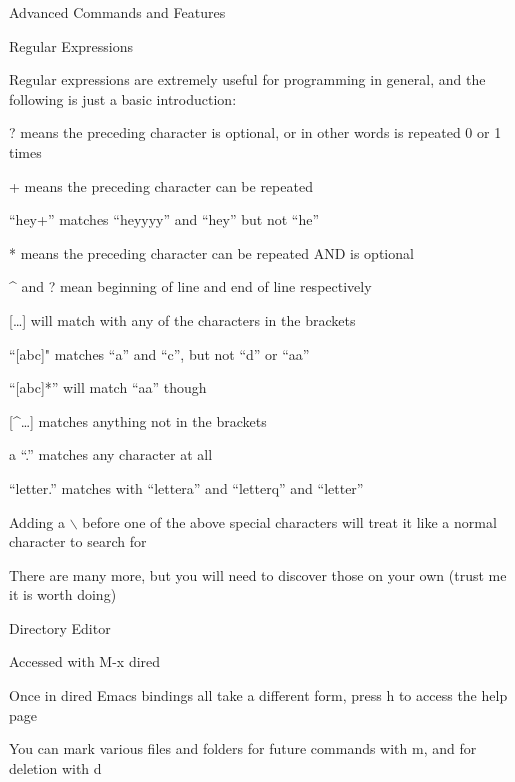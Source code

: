 \documentclass[presentation]{beamer}
\begin{document}
\begin{frame}[fragile,label=sec-4]{Advanced Commands and Features}
\begin{block}{Regular Expressions}
\begin{block}{Regular expressions are extremely useful for programming in general, and the following is just a basic introduction:}
\begin{block}{? means the preceding character is optional, or in other words is repeated 0 or 1 times}
\end{block}
\begin{block}{+ means the preceding character can be repeated}
\begin{block}{``hey+'' matches ``heyyyy'' and ``hey'' but not ``he''}
\end{block}
\end{block}
\begin{block}{* means the preceding character can be repeated AND is optional}
\end{block}
\begin{block}{\^{} and ? mean beginning of line and end of line respectively}
\end{block}
\begin{block}{[\ldots{}] will match with any of the characters in the brackets}
\begin{block}{``[abc]" matches ``a'' and ``c'', but not ``d'' or ``aa''}
\end{block}
\begin{block}{``[abc]*'' will match ``aa'' though}
\end{block}
\end{block}
\begin{block}{[\^{}\ldots{}] matches anything not in the brackets}
\end{block}
\begin{block}{a ``.'' matches any character at all}
\begin{block}{``letter.'' matches with ``lettera'' and ``letterq'' and ``letter''}
\end{block}
\end{block}
\begin{block}{Adding a $\backslash$ before one of the above special characters will treat it like a normal character to search for}
\end{block}
\begin{block}{There are many more, but you will need to discover those on your own (trust me it is worth doing)}
\end{block}
\end{block}
\end{block}
\begin{block}{Directory Editor}
\begin{block}{Accessed with M-x dired}
\end{block}
\begin{block}{Once in dired Emacs bindings all take a different form, press h to access the help page}
\end{block}
\begin{block}{You can mark various files and folders for future commands with m, and for deletion with d}

\end{block}
\end{block}
\end{frame}
\end{document}
